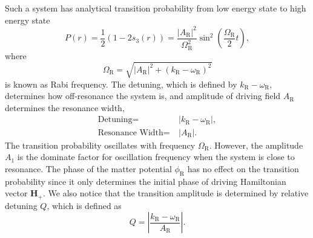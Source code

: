 \documentclass[%
reprint,
 amsmath,amssymb,
 aps,
]{revtex4-1}
\begin{document}
Such a system has analytical transition probability from low energy state to high energy state
\begin{equation}
    P(r) = \frac{1}{2}(1- 2 s_3(r))= \frac{\left \lvert A_{\mathrm{R}} \right \rvert ^2}{ \Omega_{\mathrm R}^2 } \sin^2 \left( \frac{\Omega_{\mathrm R}}{2} t \right),
    \label{rabi-system-transition-probability}
\end{equation}
where
\begin{equation}
\Omega_{\mathrm R} = \sqrt{ \lvert A_{\mathrm{R}}\rvert^2 + (k_{\mathrm{R}} - \omega_{\mathrm R})^2 }
\end{equation} is known as Rabi frequency. The detuning, which is defined by $k_{\mathrm{R}} - \omega_{\mathrm R}$, determines how off-resonance the system is, and amplitude of driving field $A_{\mathrm{R}}$ determines the resonance width,
\begin{align}
\text{Detuning} =&~\lvert k_{\mathrm{R}} - \omega_{\mathrm R} \rvert, \\
\text{Resonance Width} =&~\lvert A_{\mathrm R} \rvert.
\end{align}
The transition probability oscillates with frequency $\Omega_{\mathrm R}$. However, the amplitude $A_1$ is the dominate factor for oscillation frequency when the system is close to resonance. The phase of the matter potential $\phi_{\mathrm{R}}$ has no effect on the transition probability since it only determines the initial phase of driving Hamiltonian vector $\mathbf{H}_+$. We also notice that the transition amplitude is determined by relative detuning $Q$, which is defined as
\begin{equation}
    Q = \left\lvert \frac{ k_{\mathrm R} - \omega_{\mathrm R}}{A_{\mathrm R}} \right\rvert.
\end{equation}
\end{document}
